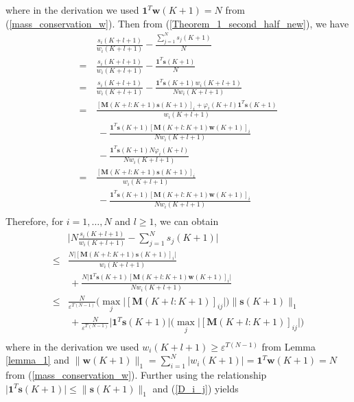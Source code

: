 \documentclass{IEEEtran}
\begin{document}
where in the derivation we used $\mathbf{1}^T \mathbf{w}(K+1)=N$ from (\ref{mass_conservation_w}). Then from (\ref{Theorem_1_second_half_new}), we have
\begin{equation}\label{pi_alpha}
\begin{aligned}
& \frac{s_i(K+l+1)}{w_i(K+l+1)}- \frac{\sum_{j=1}^{N}s_j(K+1)}{N} \\
= \, & \frac{s_i(K+l+1)}{w_i(K+l+1)}-\frac{\mathbf{1}^T \mathbf{s}(K+1)}{N} \\
= \, & \frac{s_i(K+l+1)}{w_i(K+l+1)} - \frac{\mathbf{1}^T \mathbf{s}(K+1) w_i(K+l+1)}{N w_i(K+l+1)}\\
= \, & \frac{[\mathbf{M}(K+l:K+1) \mathbf{s}(K+1)]_i + \varphi_i(K+l) \mathbf{1}^T \mathbf{s}(K+1)} {w_i(K+l+1)}\\
& \, - \frac{\mathbf{1}^T \mathbf{s}(K+1) [\mathbf{M}(K+l:K+1) \mathbf{w}(K+1)]_i}{N w_i(K+l+1)}\\
& \, - \frac{\mathbf{1}^T \mathbf{s}(K+1) N \varphi_i(K+l)}{N w_i(K+l+1)}\\
= \, & \frac{[\mathbf{M}(K+l:K+1) \mathbf{s}(K+1)]_i} {w_i(K+l+1)} \\
& \, - \frac{\mathbf{1}^T \mathbf{s}(K+1) [\mathbf{M}(K+l:K+1) \mathbf{w}(K+1)]_i} {N w_i(K+l+1)}\\
\end{aligned}
\end{equation}
Therefore, for $i=1,\ldots,N$ and $l \geq 1$, we can obtain
\begin{equation}\label{pi_alpha_absolute}
\begin{aligned}
& \big| N \frac{s_i(K+l+1)}{w_i(K+l+1)}- \sum_{j=1}^{N}s_j(K+1) \big| \\
\leq & \frac{N\big| [\mathbf{M}(K+l:K+1) \mathbf{s}(K+1)]_i \big|} {w_i(K+l+1)} \\
& \, + \frac{N\big| \mathbf{1}^T \mathbf{s}(K+1) [\mathbf{M}(K+l:K+1) \mathbf{w}(K+1)]_i \big|} {N w_i(K+l+1)}\\
\leq & \frac{N}{\varepsilon^{T(N-1)}} \big(\max_{j}\big|[\mathbf{M}(K+l:K+1)]_{ij} \big|\big) \big\|\mathbf{s}(K+1)\big\|_1 \\
& \, + \frac{N}{\varepsilon^{T(N-1)}} \big|\mathbf{1}^T \mathbf{s}(K+1)\big| \big(\max_{j}\big|[\mathbf{M}(K+l:K+1)]_{ij} \big|\big)\\
\end{aligned}
\end{equation}
where in the derivation we used $w_i(K+l+1) \geq \varepsilon^{T(N-1)}$ from Lemma \ref{lemma_1} and $\big\|\mathbf{w}(K+1)\big\|_1= \sum_{i=1}^{N} |w_i(K+1)|= \mathbf{1}^T \mathbf{w}(K+1) =N$ from (\ref{mass_conservation_w}). Further using the relationship $\big|\mathbf{1}^T \mathbf{s}(K+1)\big| \leq \big\| \mathbf{s}(K+1) \big\|_1$ and (\ref{D_i_j}) yields
\end{document}

